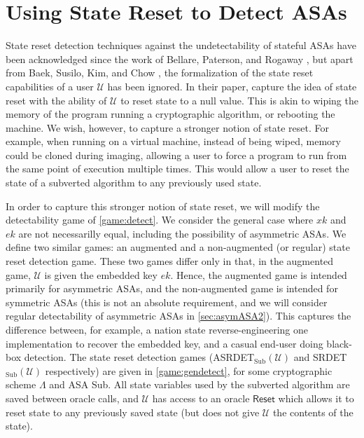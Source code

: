 \chapter{Using State Reset to Detect ASAs} \label{sec:statereset}

State reset detection techniques against the undetectability of stateful ASAs have been acknowledged since the work of Bellare, Paterson, and Rogaway \cite{C:BelPatRog14}, but apart from Baek, Susilo, Kim, and Chow \cite{BSKC2019}, the formalization of the state reset capabilities of a user $\mathcal{U}$ has been ignored. In their paper, \cite{BSKC2019} capture the idea of state reset with the ability of $\mathcal{U}$ to reset state to a null value. This is akin to wiping the memory of the program running a cryptographic algorithm, or rebooting the machine. We wish, however, to capture a stronger notion of state reset. For example, when running on a virtual machine, instead of being wiped, memory could be cloned during imaging, allowing a user to force a program to run from the same point of execution multiple times. This would allow a user to reset the state of a subverted algorithm to any previously used state.

In order to capture this stronger notion of state reset, we will modify the detectability game of \autoref{game:detect}. We consider the general case where $xk$ and $ek$ are not necessarilly equal, including the possibility of asymmetric ASAs. We define two similar games: an augmented and a non-augmented (or regular) state reset detection game. These two games differ only in that, in the augmented game, $\mathcal{U}$ is given the embedded key $ek$. Hence, the augmented game is intended primarily for asymmetric ASAs, and the non-augmented game is intended for symmetric ASAs (this is not an absolute requirement, and we will consider regular detectability of asymmetric ASAs in \autoref{sec:asymASA2}). This captures the difference between, for example, a nation state reverse-engineering one implementation to recover the embedded key, and a casual end-user doing black-box detection. The state reset detection games (ASRDET$_{\mathrm{Sub}}(\mathcal{U})$ and SRDET$_{\mathrm{Sub}}(\mathcal{U})$ respectively) are given in \autoref{game:gendetect}, for some cryptographic scheme $\mathsf{\Lambda}$ and ASA \textsf{Sub}. All state variables used by the subverted algorithm are saved between oracle calls, and $\mathcal{U}$ has access to an oracle $\mathsf{Reset}$ which allows it to reset state to any previously saved state (but does not give $\mathcal{U}$ the contents of the state).

